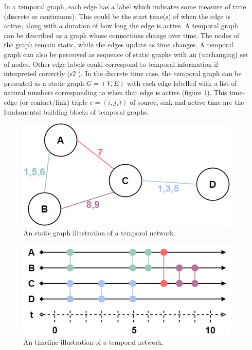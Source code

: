 \begin{introduction}
In a temporal graph, each edge has a label which indicates some measure of time (discrete or continuous). This could be the start time(s) of when the edge is active, along with a duration of how long the edge is active. A temporal graph can be described as a graph whose connections change over time. The nodes of the graph remain static, while the edges update as time changes. A temporal graph can also be perceived as sequence of static graphs with an (unchanging) set of nodes. Other edge labels could correspond to temporal information if interpreted correctly (s2 \cite{intro_temporal}).
In the discrete time case, the temporal graph can be presented as a static graph $G=(V, E)$ with each edge labelled with a list of natural numbers corresponding to when that edge is active (figure 1). This time-edge (or contact/link) triple $e = (i, j, t)$ of source, sink and active time are the fundamental building blocks of temporal graphs.
\clearpage
\begin{figure}
    \centering
    \includegraphics[scale=0.5]{images/temporal_graph_a.png}
    \caption{An static graph illustration of a temporal network.}
\end{figure}
\begin{figure}
    \centering
    \includegraphics[scale=0.6]{images/temporal_graph_b.png}
    \caption{An timeline illustration of a temporal network.}

\end{figure}
\end{introduction}
